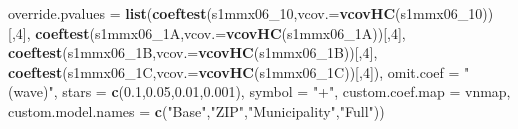 \documentclass[
]{article}
\newenvironment{Shaded}{\begin{snugshade}}{\end{snugshade}}
\newcommand{\DataTypeTok}[1]{\textcolor[rgb]{0.13,0.29,0.53}{#1}}
\newcommand{\DecValTok}[1]{\textcolor[rgb]{0.00,0.00,0.81}{#1}}
\newcommand{\FloatTok}[1]{\textcolor[rgb]{0.00,0.00,0.81}{#1}}
\newcommand{\KeywordTok}[1]{\textcolor[rgb]{0.13,0.29,0.53}{\textbf{#1}}}
\newcommand{\NormalTok}[1]{#1}
\newcommand{\StringTok}[1]{\textcolor[rgb]{0.31,0.60,0.02}{#1}}
\begin{document}
\begin{Shaded}
\begin{Highlighting}[]
          \DataTypeTok{override.pvalues =} \KeywordTok{list}\NormalTok{(}\KeywordTok{coeftest}\NormalTok{(s1mmx06_}\DecValTok{10}\NormalTok{,}\DataTypeTok{vcov.=}\KeywordTok{vcovHC}\NormalTok{(s1mmx06_}\DecValTok{10}\NormalTok{))[,}\DecValTok{4}\NormalTok{],}
                                  \KeywordTok{coeftest}\NormalTok{(s1mmx06_1A,}\DataTypeTok{vcov.=}\KeywordTok{vcovHC}\NormalTok{(s1mmx06_1A))[,}\DecValTok{4}\NormalTok{],}
                                  \KeywordTok{coeftest}\NormalTok{(s1mmx06_1B,}\DataTypeTok{vcov.=}\KeywordTok{vcovHC}\NormalTok{(s1mmx06_1B))[,}\DecValTok{4}\NormalTok{],}
                                  \KeywordTok{coeftest}\NormalTok{(s1mmx06_1C,}\DataTypeTok{vcov.=}\KeywordTok{vcovHC}\NormalTok{(s1mmx06_1C))[,}\DecValTok{4}\NormalTok{]),}
          \DataTypeTok{omit.coef =} \StringTok{"(wave)"}\NormalTok{, }\DataTypeTok{stars =} \KeywordTok{c}\NormalTok{(}\FloatTok{0.1}\NormalTok{,}\FloatTok{0.05}\NormalTok{,}\FloatTok{0.01}\NormalTok{,}\FloatTok{0.001}\NormalTok{), }\DataTypeTok{symbol =} \StringTok{"+"}\NormalTok{,}
          \DataTypeTok{custom.coef.map =}\NormalTok{ vnmap, }
          \DataTypeTok{custom.model.names =} \KeywordTok{c}\NormalTok{(}\StringTok{"Base"}\NormalTok{,}\StringTok{"ZIP"}\NormalTok{,}\StringTok{"Municipality"}\NormalTok{,}\StringTok{"Full"}\NormalTok{))}
\end{Highlighting}
\end{Shaded}
\end{document}
